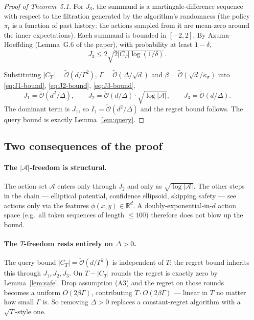 \documentclass[11pt]{article}
\newcommand{\Otilde}{\tilde{\mathcal{O}}}
\newcommand{\R}{\mathbb{R}}
\begin{document}
\begin{proof}[Proof of Theorem~5.1]
For $J_3$, the summand is a martingale-difference sequence with respect to the filtration generated by the algorithm's randomness (the policy $\pi_t$ is a function of past history; the actions sampled from it are mean-zero around the inner expectations). Each summand is bounded in $[-2, 2]$. By Azuma--Hoeffding (Lemma~G.6 of the paper), with probability at least $1 - \delta$,
\begin{equation}
  J_3 \le 2 \sqrt{2 |C_T| \log(1/\delta)}.
  \label{eq:J3-bound}
\end{equation}

Substituting $|C_T| = \Otilde(d/\Gamma^2)$, $\Gamma = \Otilde(\Delta/\sqrt d)$ and $\beta = \Otilde(\sqrt d/\kappa_\sigma)$ into \eqref{eq:J1-bound}, \eqref{eq:J2-bound}, \eqref{eq:J3-bound},
\[
  J_1 = \Otilde(d^2 / \Delta), \qquad
  J_2 = \Otilde(d / \Delta) \cdot \sqrt{\log|\mathcal{A}|}, \qquad
  J_3 = \Otilde(d / \Delta).
\]
The dominant term is $J_1$, so $I_1 = \Otilde(d^2/\Delta)$ and the regret bound follows. The query bound is exactly Lemma~\ref{lem:query}.
\end{proof}

\subsection{Two consequences of the proof}

\paragraph{The $|\mathcal{A}|$-freedom is structural.} The action set $\mathcal{A}$ enters only through $J_2$ and only as $\sqrt{\log|\mathcal{A}|}$. The other steps in the chain --- elliptical potential, confidence ellipsoid, skipping safety --- see actions only via the features $\phi(x, y) \in \R^d$. A doubly-exponential-in-$d$ action space (e.g.\ all token sequences of length $\le 100$) therefore does not blow up the bound.

\paragraph{The $T$-freedom rests entirely on $\Delta > 0$.} The query bound $|C_T| = \Otilde(d/\Gamma^2)$ is independent of $T$; the regret bound inherits this through $J_1, J_2, J_3$. On $T - |C_T|$ rounds the regret is exactly zero by Lemma~\ref{lem:safe}. Drop assumption (A3) and the regret on those rounds becomes a uniform $O(2\beta\Gamma)$, contributing $T \cdot O(2\beta\Gamma)$ --- linear in $T$ no matter how small $\Gamma$ is. So removing $\Delta > 0$ replaces a constant-regret algorithm with a $\sqrt T$-style one.
\end{document}
